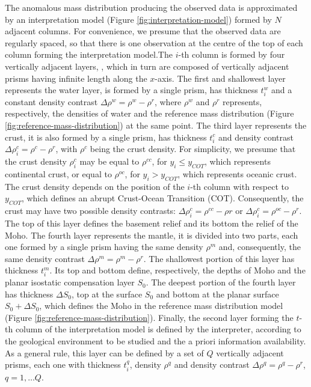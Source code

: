 \documentclass[manuscript]{geophysics}
\begin{document}
The anomalous mass distribution producing the observed data
is approximated by an interpretation model (Figure \ref{fig:interpretation-model}) 
formed by $N$ adjacent columns. For convenience, we presume that the observed data are
regularly spaced, so that there is one observation at the centre of the top of each
column forming the interpretation model.The $i$-th column is formed by four vertically
adjacent 
layers, , which in turn are composed of vertically adjacent prisms having infinite 
length along the $x$-axis. The first and shallowest layer represents the water layer, 
is formed by a single prism, has thickness $t^{w}_{i}$ and a constant density contrast 
$\Delta \rho^{w} = \rho^{w} - \rho^{r}$, where $\rho^{w}$ and $\rho^{r}$ 
represents, respectively, the densities of water and the reference mass 
distribution (Figure \ref{fig:reference-mass-distribution}) at the same point.
The third layer represents the crust, it is also formed by a single prism,
has thickness $t^{c}_{i}$ and density contrast 
$\Delta \rho^{c}_{i} = \rho^{c} - \rho^{r}$, 
with $\rho^{c}$ being the crust density. For simplicity, we presume that the crust
density $\rho^{c}_{i}$ may be equal to $\rho^{cc}$, for $y_{i} \le y_{COT}$, which
represents continental crust,
or equal to $\rho^{oc}$, for $y_{i} > y_{COT}$, which represents oceanic crust.
The crust density depends on the position of the $i$-th column with respect to
$y_{COT}$, which defines an abrupt Crust-Ocean Transition (COT). Consequently, the
crust may have two possible density contrasts: 
$\Delta \rho^{c}_{i} = \rho^{cc} - \rho{r}$ or 
$\Delta \rho^{c}_{i} = \rho^{oc} - \rho^{r}$. The top of this layer defines the 
basement relief and its bottom the relief of the Moho. The fourth layer represents the
mantle, it is divided into two parts, each one formed by a single prism having the same
density $\rho^{m}$ and, consequently, the same density contrast 
$\Delta \rho^{m} = \rho^{m} - \rho^{r}$. The shallowest
portion of this layer has thickness $t^{m}_{i}$. Its top and bottom define,
respectively, the depths of Moho and the planar isostatic compensation layer $S_{0}$.
The deepest portion of the fourth layer has thickness $\Delta S_{0}$, top at the
surface $S_{0}$ and bottom at the planar surface 
$S_{0} + \Delta S_{0}$, which defines the Moho in the reference mass distribution model 
(Figure \ref{fig:reference-mass-distribution}). Finally, the second layer forming the
$t$-th column of the interpretation model is defined by the interpreter, according to
the geological environment to be studied and the a priori information availability. 
As a general rule, this layer can be defined by a set of $Q$ vertically adjacent
prisms, each one with thickness $t^{q}_{i}$, density $\rho^{q}$ and density contrast
$\Delta \rho^{q} = \rho^{q} - \rho^{r}$, $q = 1, \dots Q$.
\end{document}
